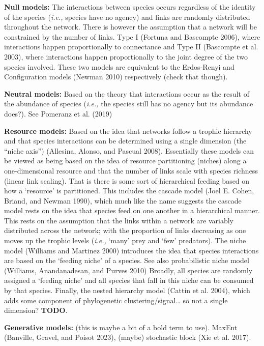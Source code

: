 \documentclass[
  letterpaper,
  DIV=11,
  numbers=noendperiod]{scrartcl}
\begin{document}
\textbf{Null models:} The interactions between species occurs regardless
of the identity of the species (\emph{i.e.,} species have no agency) and
links are randomly distributed throughout the network. There is however
the assumption that a network will be constrained by the number of
links. Type I (Fortuna and Bascompte 2006), where interactions happen
proportionally to connectance and Type II (Bascompte et al. 2003), where
interactions happen proportionally to the joint degree of the two
species involved. These two models are equivalent to the Erdos-Renyi and
Configuration models (Newman 2010) respectively (check that though).

\textbf{Neutral models:} Based on the theory that interactions occur as
the result of the abundance of species (\emph{i.e.,} the species still
has no agency but its abundance does?). See Pomeranz et al. (2019)

\textbf{Resource models:} Based on the idea that networks follow a
trophic hierarchy and that species interactions can be determined using
a single dimension (the ``niche axis'') (Allesina, Alonso, and Pascual
2008). Essentially these models can be viewed as being based on the idea
of resource partitioning (niches) along a one-dimensional resource and
that the number of links scale with species richness (linear link
scaling). That is there is some sort of hierarchical feeding based on
how a `resource' is partitioned. This includes the cascade model (Joel
E. Cohen, Briand, and Newman 1990), which much like the name suggests
the cascade model rests on the idea that species feed on one another in
a hierarchical manner. This rests on the assumption that the links
within a network are variably distributed across the network; with the
proportion of links decreasing as one moves up the trophic levels
(\emph{i.e.,} `many' prey and `few' predators). The niche model
(Williams and Martinez 2000) introduces the idea that species
interactions are based on the `feeding niche' of a species. See also
probabilistic niche model (Williams, Anandanadesan, and Purves 2010)
Broadly, all species are randomly assigned a `feeding niche' and all
species that fall in this niche can be consumed by that species.
Finally, the nested hierarchy model (Cattin et al. 2004), which adds
some component of phylogenetic clustering/signal\ldots{} so not a single
dimension? \textbf{TODO}.

\textbf{Generative models:} (this is maybe a bit of a bold term to use).
MaxEnt (Banville, Gravel, and Poisot 2023), (maybe) stochastic block
(Xie et al. 2017).
\end{document}
